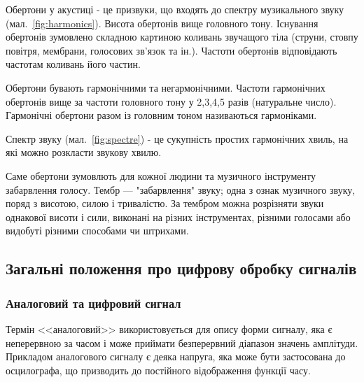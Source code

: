 


Обертони у акустиці - це призвуки, що входять до спектру музикального звуку (мал.~\ref{fig:harmonics}). Висота обертонів вище головного тону. Існування обертонів зумовлено складною картиною коливань звучащого тіла (струни, стовпу повітря, мембрани, голосових зв'язок та ін.). Частоти обертонів відповідають частотам коливань його частин.

Обертони бувають гармонічними та негармонічними. Частоти гармонічних обертонів вище за частоти головного тону у 2,3,4,5 разів (натуральне число). Гармонічні обертони разом із головним тоном називаються гармоніками.

Спектр звуку (мал.~\ref{fig:spectre}) - це сукупність простих гармонічних хвиль, на які можно розкласти звукову хвилю. \cite{келдыш1973музыкальная}

Саме обертони зумовлють для кожної людини та музичного інструменту забарвлення голосу. Тембр — "забарвлення" звуку; одна з ознак музичного звуку, поряд з висотою, силою і тривалістю. За тембром можна розрізняти звуки однакової висоти і сили, виконані на різних інструментах, різними голосами або видобуті різними способами чи штрихами. \cite{юцевич2003музика}

\subsection{Загальні положення про цифрову обробку сигналів}

\subsubsection{Аналоговий та цифровий сигнал}



Термін <<аналоговий>> використовується для опису форми сигналу, яка є неперервною за часом і може приймати безперервний діапазон значень амплітуди. Прикладом аналогового сигналу є деяка напруга, яка може бути застосована до осцилографа, що призводить до постійного відображення функції часу.


